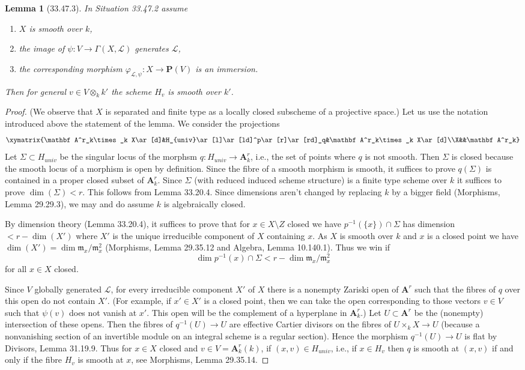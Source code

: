 \documentclass[UTF8,11pt]{ctexart}
\newtheorem*{lemma}{Lemma}
\theoremstyle{definition}
\begin{document}
\begin{lemma}[33.47.3]
In Situation 33.47.2 assume
\begin{enumerate}
\item $X$ is smooth over $k$,
\item the image of $\psi:V\to\Gamma(X,\mathcal L)$ generates $\mathcal L$,
\item the corresponding morphism $\varphi_{\mathcal L,\psi}:X\to\mathbf P(V)$ is an immersion.
\end{enumerate}
Then for general $v\in V\otimes_k k'$ the scheme $H_v$ is smooth over $k'$.
\end{lemma}
\begin{proof}
(We observe that $X$ is separated and finite type as a locally closed subscheme of a projective space.) Let us use the notation introduced above the statement of the lemma. We consider the projections
\[
\xymatrix{\mathbf A^r_k\times_k X\ar[d]&H_{univ}\ar[l]\ar[ld]^p\ar[r]\ar[rd]_q&\mathbf A^r_k\times_k X\ar[d]\\X&&\mathbf A^r_k}
\]
Let $\Sigma\subset H_{univ}$ be the singular locus of the morphsm $q:H_{univ}\to\mathbf A^r_k$, i.e., the set of points where $q$ is not smooth. Then $\Sigma$ is closed because the smooth locus of a morphism is open by definition. Since the fibre of a smooth morphism is smooth, it suffices to prove $q(\Sigma)$ is contained in a proper closed subset of $\mathbf A^r_k$. Since $\Sigma$ (with reduced induced scheme structure) is a finite type scheme over $k$ it suffices to prove $\dim(\Sigma)<r$. This follows from Lemma 33.20.4. Since dimensions aren't changed by replacing $k$ by a bigger field (Morphisms, Lemma 29.29.3), we may and do assume $k$ is algebraically closed.

By dimension theory (Lemma 33.20.4), it suffices to prove that for $x\in X\setminus Z$ closed we have $p^{-1}(\{x\})\cap\Sigma$ has dimension $<r-\dim(X')$ where $X'$ is the unique irreducible component of $X$ containing $x$. As $X$ is smooth over $k$ and $x$ is a closed point we have $\dim(X')=\dim\mathfrak m_x/\mathfrak m_x^2$ (Morphisms, Lemma 29.35.12 and Algebra, Lemma 10.140.1). Thus we win if
\[\dim p^{-1}(x)\cap\Sigma<r-\dim\mathfrak m_x/\mathfrak m_x^2\]
for all $x\in X$ closed.

Since $V$ globally generated $\mathcal L$, for every irreducible component $X'$ of $X$ there is a nonempty Zariski open of $\mathbf A^r$ such that the fibres of $q$ over this open do not contain $X'$. (For example, if $x'\in X'$ is a closed point, then we can take the open corresponding to those vectors $v\in V$ such that $\psi(v)$ does not vanish at $x'$. This open will be the complement of a hyperplane in $\mathbf A^r_k$.) Let $U\subset\mathbf A^r$ be the (nonempty) intersection of these opens. Then the fibres of $q^{-1}(U)\to U$ are effective Cartier divisors on the fibres of $U\times_k X\to U$ (because a nonvanishing section of an invertible module on an integral scheme is a regular section). Hence the morphism $q^{-1}(U)\to U$ is flat by Divisors, Lemma 31.19.9. Thus for $x\in X$ closed and $v\in V=\mathbf A^r_k(k)$, if $(x,v)\in H_{univ}$, i.e., if $x\in H_v$ then $q$ is smooth at $(x,v)$ if and only if the fibre $H_v$ is smooth at $x$, see Morphisms, Lemma 29.35.14.


\end{proof}
\end{document}

